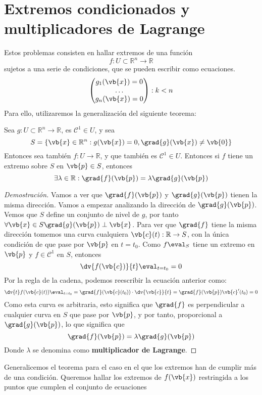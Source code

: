 \documentclass{../Calculo.tex}
\begin{document}
\section{Extremos condicionados y multiplicadores de Lagrange}
Estos problemas consisten en hallar extremos de una función
\[
	f:U \subset \mathbb{R}^{n} \to \mathbb{R}
\]
sujetos a una serie de condiciones, que se pueden escribir como ecuaciones.
\[
	\begin{pmatrix} 
	g_1(\vb{x})= 0\\
	\dots \\
	g_{n}(\vb{x}) = 0
	\end{pmatrix} : k < n
\]
Para ello, utilizaremos la generalización del siguiente teorema:
\begin{teorema}
Sea $g:U \subset \mathbb{R}^{n} \to \mathbb{R}$, es $\mathcal{C}^{1} \in U$, y sea
\[
	S = \{ \vb{x} \in \mathbb{R}^{n} : g(\vb{x})=0, \grad{g}(\vb{x}) \neq \vb{0} \}
\]
Entonces sea también $f: U \to \mathbb{R}$, y que también es $\mathcal{C}^{1} \in U$. Entonces si $f$ tiene un extremo sobre $S$ en $\vb{p} \in S$, entonces
\[
	\exists \lambda \in \mathbb{R}: \grad{f}(\vb{p})= \lambda \grad{g}(\vb{p})
\]
\end{teorema}
\begin{proof}[Demostración]
	Vamos a ver que $\grad{f}(\vb{p})$ y $\grad{g}(\vb{p})$ tienen la misma dirección. Vamos a empezar analizando la dirección de $\grad{g}(\vb{p})$. Vemos que $S$ define un conjunto de nivel de $g$, por tanto $\forall \vb{x} \in S \grad{g}(\vb{p}) \perp \vb{x}$. Para ver que $\grad{f}$ tiene la misma dirección tomemos una curva cualquiera $\vb{c}(t): \mathbb{R} \to S$, con la única condición de que pase por $\vb{p}$ en $t=t_0$. Como $f\eval_{S}$ tiene un extremo en $\vb{p}$ y $f \in \mathcal{C}^{1}$ en $S$, entonces
	\[
		\dv{f(\vb{c})}{t}\eval_{t=t_0} = 0
	\]
	Por la regla de la cadena, podemos reescribir la ecuación anterior como:
	\[
		\dv{t}f(\vb{c}(t))\eval_{t=t_0}=\grad{f}(\vb{c}(t_0))\cdot \dv{\vb{c}}{t}
		= \grad{f}(\vb{p}) \vb{c}'(t_0)=0
	\]
	Como esta curva es arbitraria, esto significa que $\grad{f}$ es perpendicular a cualquier curva en $S$ que pase por $\vb{p}$, y por tanto, proporcional a $\grad{g}(\vb{p})$, lo que significa que
	\[
		\grad{f}(\vb{p}) = \lambda\grad{g}(\vb{p})
	\]
	Donde $\lambda$ se denomina como \textbf{multiplicador de Lagrange}. 
\end{proof}
Generalicemos el teorema para el caso en el que los extremos han de cumplir más de una condición. Queremos hallar los extremos de $f(\vb{x})$ restringida a los puntos que cumplen el conjunto de ecuaciones 
\end{document}
